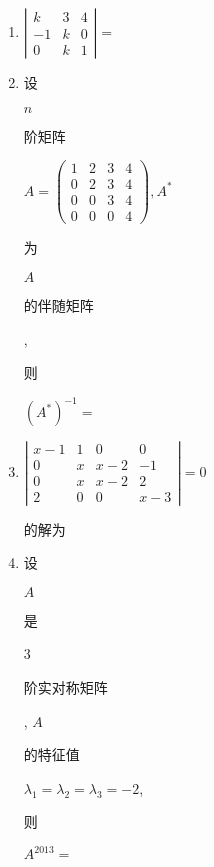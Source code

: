 \documentclass[10pt]{article}
\begin{document}
\begin{enumerate}
  \item $\left|\begin{array}{ccc}k & 3 & 4 \\ -1 & k & 0 \\ 0 & k & 1\end{array}\right|=$

  \item \begin{CJK}{UTF8}{mj}设\end{CJK} $n$ \begin{CJK}{UTF8}{mj}阶矩阵\end{CJK} $A=\left(\begin{array}{cccc}1 & 2 & 3 & 4 \\ 0 & 2 & 3 & 4 \\ 0 & 0 & 3 & 4 \\ 0 & 0 & 0 & 4\end{array}\right), A^{*}$ \begin{CJK}{UTF8}{mj}为\end{CJK} $A$ \begin{CJK}{UTF8}{mj}的伴随矩阵\end{CJK}, \begin{CJK}{UTF8}{mj}则\end{CJK} $\left(A^{*}\right)^{-1}=$

  \item $\left|\begin{array}{cccc}x-1 & 1 & 0 & 0 \\ 0 & x & x-2 & -1 \\ 0 & x & x-2 & 2 \\ 2 & 0 & 0 & x-3\end{array}\right|=0$ \begin{CJK}{UTF8}{mj}的解为\end{CJK}

  \item \begin{CJK}{UTF8}{mj}设\end{CJK} $A$ \begin{CJK}{UTF8}{mj}是\end{CJK} 3 \begin{CJK}{UTF8}{mj}阶实对称矩阵\end{CJK}, $A$ \begin{CJK}{UTF8}{mj}的特征值\end{CJK} $\lambda_{1}=\lambda_{2}=\lambda_{3}=-2$, \begin{CJK}{UTF8}{mj}则\end{CJK} $A^{2013}=$


\end{enumerate}
\end{document}
